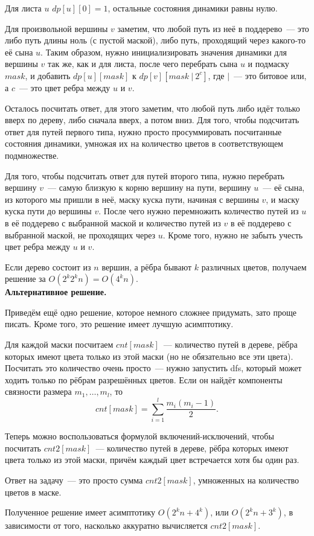 \documentclass[12pt]{article}
\theoremstyle{definition}
\begin{document}
Для листа $u$ $dp[u][0]=1$, остальные состояния динамики равны нулю.

Для произвольной вершины $v$ заметим, что любой путь из неё в поддерево~--- это либо путь длины ноль (с пустой маской), либо путь, проходящий через какого-то её сына $u$. Таким образом, нужно инициализировать значения динамики для вершины $v$ так же, как и для листа, после чего перебрать сына $u$ и подмаску $mask$, и добавить $dp[u][mask]$ к $dp[v][mask\ |\ 2^c]$, где $|$~--- это битовое или, а $c$~--- это цвет ребра между $u$ и $v$.

Осталось посчитать ответ, для этого заметим, что любой путь либо идёт только вверх по дереву, либо сначала вверх, а потом вниз. Для того, чтобы подсчитать ответ для путей первого типа, нужно просто просуммировать посчитанные состояния динамики, умножая их на количество цветов в соответствующем подмножестве.

Для того, чтобы подсчитать ответ для путей второго типа, нужно перебрать вершину $v$~--- самую близкую к корню вершину на пути, вершину $u$~--- её сына, из которого мы пришли в неё, маску куска пути, начиная с вершины $v$, и маску куска пути до вершины $v$. После чего нужно перемножить количество путей из $u$ в её поддерево с выбранной маской и количество путей из $v$ в её поддерево с выбранной маской, не проходящих через $u$. Кроме того, нужно не забыть учесть цвет ребра между $u$ и $v$.

Если дерево состоит из $n$ вершин, а рёбра бывают $k$ различных цветов, получаем решение за $O(2^k2^kn)=O(4^kn)$.\\

\textbf{Альтернативное решение.}

Приведём ещё одно решение, которое немного сложнее придумать, зато проще писать. Кроме того, это решение имеет лучшую асимптотику.

Для каждой маски посчитаем $cnt[mask]$~--- количество путей в дереве, рёбра которых имеют цвета только из этой маски (но не обязательно все эти цвета). Посчитать это количество очень просто~--- нужно запустить dfs, который может ходить только по рёбрам разрешённых цветов. Если он найдёт компоненты связности размера $m_1,\dots,m_l$, то
$$
cnt[mask]=\sum_{i=1}^l \frac{m_i(m_i-1)}{2}.
$$

Теперь можно воспользоваться формулой включений-исключений, чтобы посчитать $cnt2[mask]$~--- количество путей в дереве, рёбра которых имеют цвета только из этой маски, причём каждый цвет встречается хотя бы один раз.

Ответ на задачу~--- это просто сумма $cnt2[mask]$, умноженных на количество цветов в маске.

Полученное решение имеет асимптотику $O(2^kn+4^k)$, или $O(2^kn+3^k)$, в зависимости от того, насколько аккуратно вычисляется $cnt2[mask]$.
\end{document}
